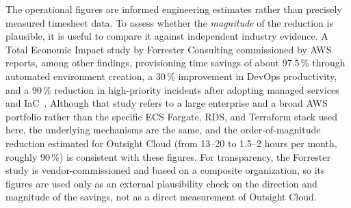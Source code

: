 The operational figures are informed engineering estimates rather than precisely measured timesheet data. To assess whether the \emph{magnitude} of the reduction is plausible, it is useful to compare it against independent industry evidence. A Total Economic Impact study by Forrester Consulting commissioned by AWS reports, among other findings, provisioning time savings of about 97.5\,\% through automated environment creation, a 30\,\% improvement in DevOps productivity, and a 90\,\% reduction in high-priority incidents after adopting managed services and IaC~\cite{forresterTeiCloudOps}. Although that study refers to a large enterprise and a broad AWS portfolio rather than the specific ECS Fargate, RDS, and Terraform stack used here, the underlying mechanisms are the same, and the order-of-magnitude reduction estimated for Outsight Cloud (from 13--20 to 1.5--2 hours per month, roughly 90\,\%) is consistent with these figures. For transparency, the Forrester study is vendor-commissioned and based on a composite organization, so its figures are used only as an external plausibility check on the direction and magnitude of the savings, not as a direct measurement of Outsight Cloud.
